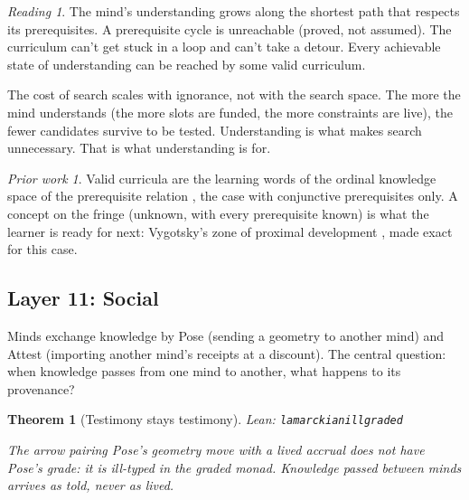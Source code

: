 \documentclass[11pt]{article}
\newcommand{\leanus}{\textunderscore\allowbreak}
\newcommand{\lean}[1]{{\let\_\leanus\texttt{#1}}}
\newtheorem{theorem}{Theorem}[section]
\theoremstyle{remark}
\newtheorem*{reading}{Reading}
\newtheorem*{prior}{Prior work}
\begin{document}
\begin{reading}
The mind's understanding grows along the shortest path that respects its prerequisites.
A prerequisite cycle is unreachable (proved, not assumed). The curriculum can't get stuck
in a loop and can't take a detour. Every achievable state of understanding can be reached
by some valid curriculum.

The cost of search scales with ignorance, not with the search space. The more the mind
understands (the more slots are funded, the more constraints are live), the fewer
candidates survive to be tested. Understanding is what makes search unnecessary. That is
what understanding is for.
\end{reading}

\begin{prior}
Valid curricula are the learning words of the ordinal knowledge space of the prerequisite
relation \citep{DoignonFalmagne1985,FalmagneDoignon2011,CosynUzun2009}, the case with
conjunctive prerequisites only. A concept on the fringe (unknown, with every prerequisite
known) is what the learner is ready for next: Vygotsky's zone of proximal development
\citep{Vygotsky1978}, made exact for this case.
\end{prior}

\subsection{Layer 11: Social}

Minds exchange knowledge by Pose (sending a geometry to another mind) and Attest
(importing another mind's receipts at a discount). The central question: when knowledge
passes from one mind to another, what happens to its provenance?

\begin{theorem}[Testimony stays testimony]
{\small\sloppy Lean: \lean{lamarckian\_ill\_graded}\par}
The arrow pairing Pose's geometry move with a lived accrual does not have Pose's grade:
it is ill-typed in the graded monad. Knowledge passed between minds arrives as told, never
as lived.
\end{theorem}
\end{document}
